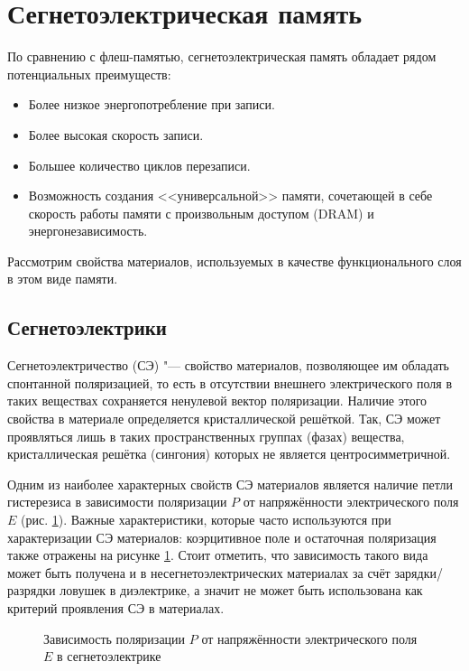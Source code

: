 \section{Сегнетоэлектрическая память}\label{sec:ch1/sec2}

По сравнению с флеш-памятью, сегнетоэлектрическая память обладает рядом потенциальных преимуществ:
\begin{itemize}
    \item Более низкое энергопотребление при записи.
    \item Более высокая скорость записи.
    \item Большее количество циклов перезаписи.
    \item Возможность создания <<универсальной>> памяти, сочетающей в себе скорость работы памяти с произвольным доступом (DRAM) и энергонезависимость.
\end{itemize}

Рассмотрим свойства материалов, используемых в качестве функционального слоя в этом виде памяти.

\subsection{Сегнетоэлектрики}
Сегнетоэлектричество (СЭ) "--- свойство материалов, позволяющее им обладать спонтанной поляризацией, то есть в отсутствии внешнего электрического поля в таких веществах сохраняется ненулевой вектор поляризации. Наличие этого свойства в материале определяется кристаллической решёткой. Так, СЭ может проявляться лишь в таких пространственных группах (фазах) вещества, кристаллическая решётка (сингония) которых не является центросимметричной.

Одним из наиболее характерных свойств СЭ материалов является наличие петли гистерезиса в зависимости поляризации \(P\) от напряжённости электрического поля \(E\) (рис. \cref{fig:hysteresis}). Важные характеристики, которые часто используются при характеризации СЭ материалов: коэрцитивное поле и остаточная поляризация также отражены на рисунке \cref{fig:hysteresis}. Стоит отметить, что зависимость такого вида может быть получена и в несегнетоэлектрических материалах за счёт зарядки/разрядки ловушек в диэлектрике, а значит не может быть использована как критерий проявления СЭ в материалах.

\begin{figure}[ht]
    \caption{Зависимость поляризации \(P\) от напряжённости электрического поля \(E\) в сегнетоэлектрике}\label{fig:hysteresis}
\end{figure}

